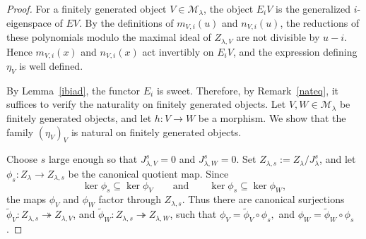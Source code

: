 \documentclass[a4,10pt]{amsart}
\numberwithin{equation}{section}
\theoremstyle{definition}
\begin{document}
\begin{proof}
For a finitely generated object \(V\in\mathcal M_\lambda\), the object \(E_iV\)
is the generalized \(i\)-eigenspace of \(EV\).
By the definitions of $m_{V, i}(u)$ and $n_{V, i}(u)$, the reductions of these polynomials modulo the maximal ideal of $Z_{\lambda, V}$ are not divisible by $u-i$. 
Hence 
\(m_{V,i}(x)\) and \(n_{V,i}(x)\) act invertibly on \(E_iV\), and   the
expression defining \(\eta_V\) is well defined.

 
By Lemma~\ref{ibiad}, the functor \(E_i\) is sweet. Therefore, by
Remark~\ref{nateq}, it suffices to verify the naturality on finitely generated
objects. Let \(V,W\in\mathcal M_\lambda\) be finitely generated objects, and let
\(h:V\to W\) be a morphism. We  show that the family  $(\eta_V)_V$  is natural on finitely generated objects. 

Choose \(s\) large enough so that
$
J_{\lambda,V}^{s}=0$ and 
$
J_{\lambda,W}^{s}=0$.
Set $
Z_{\lambda,s}:=Z_\lambda/J_\lambda^s$,
and let
$
\phi_s:Z_\lambda\to Z_{\lambda,s}
$
be the canonical quotient map. Since
\[
\ker\phi_s\subseteq\ker\phi_V
\qquad\text{and}\qquad
\ker\phi_s\subseteq\ker\phi_W,
\]
the maps \(\phi_V\) and \(\phi_W\) factor through \(Z_{\lambda,s}\). Thus there
are canonical surjections
$
\widetilde\phi_V:Z_{\lambda,s}\twoheadrightarrow Z_{\lambda,V}$,
and $
\widetilde\phi_W:Z_{\lambda,s}\twoheadrightarrow Z_{\lambda,W}$,
such that
$
\phi_V=\widetilde\phi_V\circ\phi_s,
$ and 
$\phi_W=\widetilde\phi_W\circ\phi_s$.



\end{proof}
\end{document}
